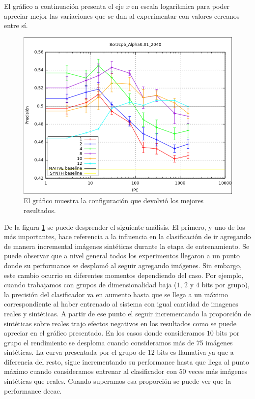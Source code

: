 	El gráfico a continuación presenta el eje \textit{x} en escala logarítmica para poder apreciar mejor las variaciones que se dan al experimentar con valores cercanos entre sí.
	
			\begin{figure}[!htbp]
				\centering
				\includegraphics[scale=0.6]{img/resultados/mixtas/best_mean_2040.png}
				\caption[Mixtas media mejor resultado]{El gráfico muestra la configuración que devolvió los mejores resultados.}
				\label{fig: Mixtas-media-mejor}
			\end{figure}

	De la figura \ref{fig: Mixtas-media-mejor} se puede desprender el siguiente análisis. El primero, y uno de los más importantes, hace referencia a la influencia en la clasificación de ir agregando de manera incremental imágenes sintéticas durante la etapa de entrenamiento. Se puede observar que a nivel general todos los experimentos llegaron a un punto donde su performance se desplomó al seguir agregando imágenes. Sin embargo, este cambio ocurrio en diferentes momentos dependiendo del caso. Por ejemplo, cuando trabajamos con grupos de dimensionalidad baja ($1$, $2$ y $4$ bits por grupo), la precisión del clasificador va en aumento hasta que se llega a un máximo correspondiente al haber entrenado al sistema con igual cantidad de imagenes reales y sintéticas. A partir de ese punto el seguir incrementando la proporción de sintéticas sobre reales trajo efectos negativos en los resultados como se puede apreciar en el gráfico presentado. En los casos donde consideramos $10$ bits por grupo el rendimiento se desploma cuando consideramos más de 75 imágenes sintéticas. La curva presentada por el grupo de $12$ bits es llamativa ya que a diferencia del resto, sigue incrementando su performance hasta que llega al punto máximo cuando consideramos entrenar al clasificador con $50$ veces más imágenes sintéticas que reales. Cuando superamos esa proporción se puede ver que la performance decae.
	
